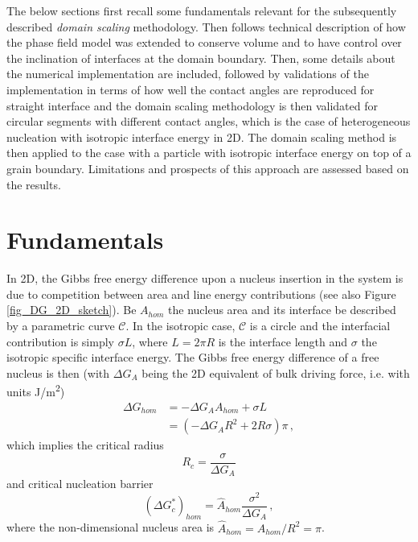 The below sections first recall some fundamentals relevant for the subsequently described \textit{domain scaling} methodology. Then follows technical description of how the phase field model was extended to conserve volume and to have control over the inclination of interfaces at the domain boundary. Then, some details about the numerical implementation are included, followed by validations of the implementation in terms of how well the contact angles are reproduced for straight interface and the domain scaling methodology is then validated for circular segments with different contact angles, which is the case of heterogeneous nucleation with isotropic interface energy in 2D. The domain scaling method is then applied to the case with a particle with isotropic interface energy on top of a  grain boundary. Limitations and prospects of this approach are assessed based on the results.

%


\section{Fundamentals}
In 2D, the Gibbs free energy difference upon a nucleus insertion in the system is due to competition between area and line energy contributions (see also Figure \ref{fig_DG_2D_sketch}). Be $A_{hom}$ the nucleus area and its interface be described by a parametric curve $\mathcal{C}$. In the isotropic case, $\mathcal{C}$ is a circle and the interfacial contribution is simply $\sigma L$, where $L=2\pi R$ is the interface length and $\sigma$ the isotropic specific interface energy. The Gibbs free energy difference of a free nucleus is then (with $\Delta G_A$ being the 2D equivalent of bulk driving force, i.e. with units \unit{J/m^2})
\begin{align}
	\Delta G_{hom} &= -\Delta G_A A_{hom} + \sigma L \\
	\label{eq_DG_hom_iso}	&= (-\Delta G_A R^2 + 2R\sigma)\pi \,,
\end{align}
which implies the critical radius
\begin{equation} \label{eq_crit_radius_2D}
	R_c = \frac{\sigma}{\Delta G_A}
\end{equation}
and critical nucleation barrier
\begin{equation} \label{eq_nucl_barr_hom_2D}
	(\Delta G_c^*)_{hom} = \hat{A}_{hom}\frac{\sigma^2}{\Delta G_A}\,,
\end{equation}
where the non-dimensional nucleus area is $\hat{A}_{hom}=A_{hom}/R^2=\pi$.

